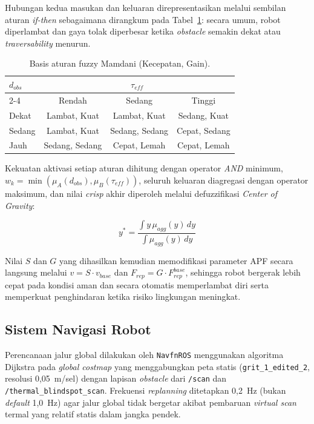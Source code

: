 \documentclass[10pt,twocolumn]{article}
\begin{document}
Hubungan kedua masukan dan keluaran direpresentasikan melalui sembilan aturan \textit{if-then} sebagaimana dirangkum pada Tabel~\ref{tab:rule_base}: secara umum, robot diperlambat dan gaya tolak diperbesar ketika \textit{obstacle} semakin dekat atau \textit{traversability} menurun.

\begin{table}[!htb]
\centering
\caption{Basis aturan fuzzy Mamdani (Kecepatan, Gain).}
\label{tab:rule_base}
\footnotesize
\begin{tabular}{lccc}
\toprule
\multirow{2}{*}{$d_{obs}$} & \multicolumn{3}{c}{$\tau_{eff}$} \\
\cmidrule(lr){2-4}
 & Rendah & Sedang & Tinggi \\
\midrule
Dekat  & Lambat, Kuat & Lambat, Kuat & Sedang, Kuat \\
Sedang & Lambat, Kuat & Sedang, Sedang & Cepat, Sedang \\
Jauh   & Sedang, Sedang & Cepat, Lemah & Cepat, Lemah \\
\bottomrule
\end{tabular}
\end{table}

Kekuatan aktivasi setiap aturan dihitung dengan operator \textit{AND} minimum, $w_k=\min(\mu_A(d_{obs}),\mu_B(\tau_{eff}))$, seluruh keluaran diagregasi dengan operator maksimum, dan nilai \textit{crisp} akhir diperoleh melalui defuzzifikasi \textit{Center of Gravity}:

\begin{equation}
y^{*}=\frac{\int y\,\mu_{agg}(y)\,dy}{\int \mu_{agg}(y)\,dy}
\label{eq:cog}
\end{equation}

Nilai $S$ dan $G$ yang dihasilkan kemudian memodifikasi parameter APF secara langsung melalui $v=S\cdot v_{base}$ dan $F_{rep}=G\cdot F_{rep}^{base}$, sehingga robot bergerak lebih cepat pada kondisi aman dan secara otomatis memperlambat diri serta memperkuat penghindaran ketika risiko lingkungan meningkat.

\subsection{Sistem Navigasi Robot}

Perencanaan jalur global dilakukan oleh \texttt{NavfnROS} menggunakan algoritma Dijkstra pada \textit{global costmap} yang menggabungkan peta statis (\texttt{grit\_1\_edited\_2}, resolusi 0,05~m/sel) dengan lapisan \textit{obstacle} dari \texttt{/scan} dan \texttt{/thermal\_blindspot\_scan}. Frekuensi \textit{replanning} ditetapkan 0,2~Hz (bukan \textit{default} 1,0~Hz) agar jalur global tidak bergetar akibat pembaruan \textit{virtual scan} termal yang relatif statis dalam jangka pendek.
\end{document}
